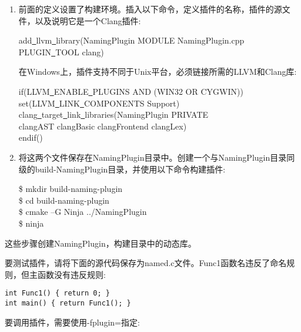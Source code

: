 \begin{enumerate}
\item 前面的定义设置了构建环境。插入以下命令，定义插件的名称，插件的源文件，以及说明它是一个Clang插件:
\begin{tcolorbox}[colback=white,colframe=black]
add\underline{~}llvm\underline{~}library(NamingPlugin MODULE NamingPlugin.cpp \\
\hspace*{3cm}PLUGIN\underline{~}TOOL clang)
\end{tcolorbox}

在Windows上，插件支持不同于Unix平台，必须链接所需的LLVM和Clang库:
\begin{tcolorbox}[colback=white,colframe=black]
if(LLVM\underline{~}ENABLE\underline{~}PLUGINS AND (WIN32 OR CYGWIN)) \\
\hspace*{0.5cm}set(LLVM\underline{~}LINK\underline{~}COMPONENTS Support) \\
\hspace*{0.5cm}clang\underline{~}target\underline{~}link\underline{~}libraries(NamingPlugin PRIVATE \\
\hspace*{1cm}clangAST clangBasic clangFrontend clangLex) \\
endif()
\end{tcolorbox}

\item 将这两个文件保存在NamingPlugin目录中。创建一个与NamingPlugin目录同级的build-NamingPlugin目录，并使用以下命令构建插件:
\begin{tcolorbox}[colback=white,colframe=black]
\$ mkdir build-naming-plugin \\
\$ cd build-naming-plugin \\
\$ cmake –G Ninja ../NamingPlugin \\
\$ ninja
\end{tcolorbox}

\end{enumerate}

这些步骤创建NamingPlugin，构建目录中的动态库。\par

要测试插件，请将下面的源代码保存为named.c文件。Func1函数名违反了命名规则，但主函数没有违反规则:\par

\begin{lstlisting}[caption={}]
int Func1() { return 0; }
int main() { return Func1(); }
\end{lstlisting}

要调用插件，需要使用-fplugin=指定:\par


